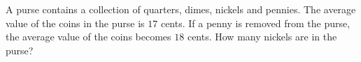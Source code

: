 A purse contains a collection of quarters, dimes, nickels and pennies. The average value of the coins in the purse is $17$ cents. If a penny is removed from the purse, the average value of the coins becomes $18$ cents. How many nickels are in the purse?
